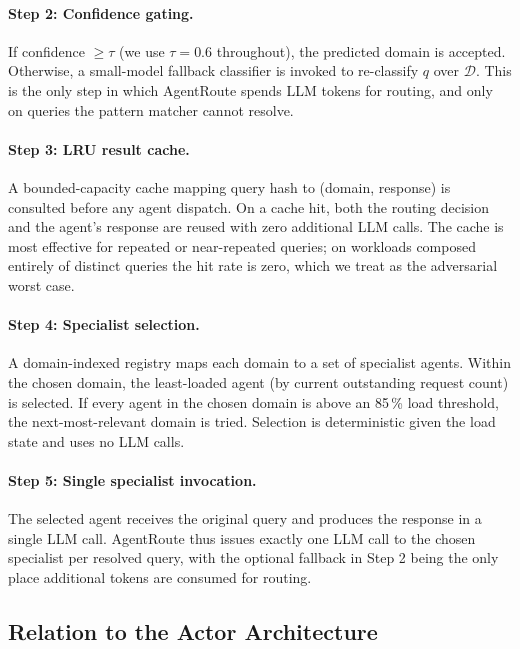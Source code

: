 \documentclass[11pt]{article}
\begin{document}
\paragraph{Step 2: Confidence gating.}
If confidence $\geq \tau$ (we use $\tau{=}0.6$ throughout), the predicted
domain is accepted. Otherwise, a small-model fallback classifier is invoked
to re-classify $q$ over $\mathcal{D}$. This is the only step in which
AgentRoute spends LLM tokens for routing, and only on queries the pattern
matcher cannot resolve.

\paragraph{Step 3: LRU result cache.}
A bounded-capacity cache mapping query hash to (domain, response) is
consulted before any agent dispatch. On a cache hit, both the routing
decision and the agent's response are reused with zero additional LLM
calls. The cache is most effective for repeated or near-repeated queries;
on workloads composed entirely of distinct queries the hit rate is zero,
which we treat as the adversarial worst case.

\paragraph{Step 4: Specialist selection.}
A domain-indexed registry maps each domain to a set of specialist agents.
Within the chosen domain, the least-loaded agent (by current outstanding
request count) is selected. If every agent in the chosen domain is above
an 85\,\% load threshold, the next-most-relevant domain is tried. Selection
is deterministic given the load state and uses no LLM calls.

\paragraph{Step 5: Single specialist invocation.}
The selected agent receives the original query and produces the response in
a single LLM call. AgentRoute thus issues exactly one LLM call to the
chosen specialist per resolved query, with the optional fallback in Step 2
being the only place additional tokens are consumed for routing.

\subsection{Relation to the Actor Architecture}
\label{sec:design:actor}
\end{document}
